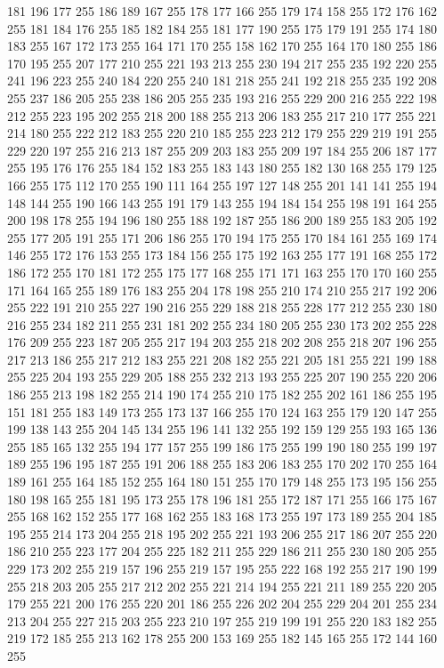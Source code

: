 181 196 177 255 186 189 167 255 178 177 166 255 179 174 158 255 172 176 162 255 181 184 176 255 185 182 184 255 181 177 190 255 175 179 191 255 174 180 183 255 167 172 173 255 164 171 170 255 158 162 170 255 164 170 180 255 186 170 195 255 207 177 210 255
221 193 213 255 230 194 217 255 235 192 220 255 241 196 223 255 240 184 220 255 240 181 218 255 241 192 218 255 235 192 208 255 237 186 205 255 238 186 205 255 235 193 216 255 229 200 216 255 222 198 212 255 223 195 202 255 218 200 188 255 213 206 183 255
217 210 177 255 221 214 180 255 222 212 183 255 220 210 185 255 223 212 179 255 229 219 191 255 229 220 197 255 216 213 187 255 209 203 183 255 209 197 184 255 206 187 177 255 195 176 176 255 184 152 183 255 183 143 180 255 182 130 168 255 179 125 166 255
175 112 170 255 190 111 164 255 197 127 148 255 201 141 141 255 194 148 144 255 190 166 143 255 191 179 143 255 194 184 154 255 198 191 164 255 200 198 178 255 194 196 180 255 188 192 187 255 186 200 189 255 183 205 192 255 177 205 191 255 171 206 186 255
170 194 175 255 170 184 161 255 169 174 146 255 172 176 153 255 173 184 156 255 175 192 163 255 177 191 168 255 172 186 172 255 170 181 172 255 175 177 168 255 171 171 163 255 170 170 160 255 171 164 165 255 189 176 183 255 204 178 198 255 210 174 210 255
217 192 206 255 222 191 210 255 227 190 216 255 229 188 218 255 228 177 212 255 230 180 216 255 234 182 211 255 231 181 202 255 234 180 205 255 230 173 202 255 228 176 209 255 223 187 205 255 217 194 203 255 218 202 208 255 218 207 196 255 217 213 186 255
217 212 183 255 221 208 182 255 221 205 181 255 221 199 188 255 225 204 193 255 229 205 188 255 232 213 193 255 225 207 190 255 220 206 186 255 213 198 182 255 214 190 174 255 210 175 182 255 202 161 186 255 195 151 181 255 183 149 173 255 173 137 166 255
170 124 163 255 179 120 147 255 199 138 143 255 204 145 134 255 196 141 132 255 192 159 129 255 193 165 136 255 185 165 132 255 194 177 157 255 199 186 175 255 199 190 180 255 199 197 189 255 196 195 187 255 191 206 188 255 183 206 183 255 170 202 170 255
164 189 161 255 164 185 152 255 164 180 151 255 170 179 148 255 173 195 156 255 180 198 165 255 181 195 173 255 178 196 181 255 172 187 171 255 166 175 167 255 168 162 152 255 177 168 162 255 183 168 173 255 197 173 189 255 204 185 195 255 214 173 204 255
218 195 202 255 221 193 206 255 217 186 207 255 220 186 210 255 223 177 204 255 225 182 211 255 229 186 211 255 230 180 205 255 229 173 202 255 219 157 196 255 219 157 195 255 222 168 192 255 217 190 199 255 218 203 205 255 217 212 202 255 221 214 194 255
221 211 189 255 220 205 179 255 221 200 176 255 220 201 186 255 226 202 204 255 229 204 201 255 234 213 204 255 227 215 203 255 223 210 197 255 219 199 191 255 220 183 182 255 219 172 185 255 213 162 178 255 200 153 169 255 182 145 165 255 172 144 160 255
